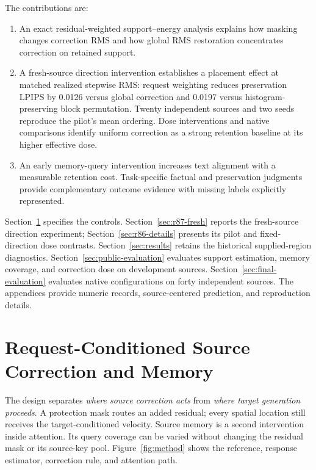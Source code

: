 \documentclass[conference]{IEEEtran}
\begin{document}
The contributions are:
\begin{enumerate}
\item An exact residual-weighted support--energy analysis explains how masking changes correction RMS and how global RMS restoration concentrates correction on retained support.
\item A fresh-source direction intervention establishes a placement effect at matched realized stepwise RMS: request weighting reduces preservation LPIPS by 0.0126 versus global correction and 0.0197 versus histogram-preserving block permutation. Twenty independent sources and two seeds reproduce the pilot's mean ordering. Dose interventions and native comparisons identify uniform correction as a strong retention baseline at its higher effective dose.
\item An early memory-query intervention increases text alignment with a measurable retention cost. Task-specific factual and preservation judgments provide complementary outcome evidence with missing labels explicitly represented.
\end{enumerate}

Section~\ref{sec:method} specifies the controls. Section~\ref{sec:r87-fresh} reports the fresh-source direction experiment; Section~\ref{sec:r86-details} presents its pilot and fixed-direction dose contrasts. Section~\ref{sec:results} retains the historical supplied-region diagnostics. Section~\ref{sec:public-evaluation} evaluates support estimation, memory coverage, and correction dose on development sources. Section~\ref{sec:final-evaluation} evaluates native configurations on forty independent sources. The appendices provide numeric records, source-centered prediction, and reproduction details.



\section{Request-Conditioned Source Correction and Memory}
\label{sec:method}
The design separates \emph{where source correction acts} from \emph{where target generation proceeds}. A protection mask routes an added residual; every spatial location still receives the target-conditioned velocity. Source memory is a second intervention inside attention. Its query coverage can be varied without changing the residual mask or its source-key pool. Figure~\ref{fig:method} shows the reference, response estimator, correction rule, and attention path.
\end{document}
